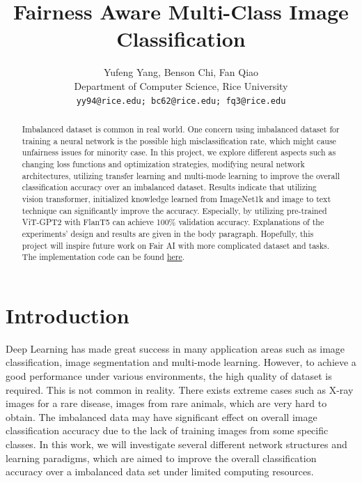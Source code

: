 \documentclass[10pt,twocolumn,letterpaper]{article}
\begin{document}
\title{Fairness Aware Multi-Class Image Classification }
\author{Yufeng Yang, Benson Chi, Fan Qiao\\
Department of Computer Science, Rice University\\
{\tt\small yy94@rice.edu; bc62@rice.edu; fq3@rice.edu}
}

\maketitle

\begin{abstract}
   Imbalanced dataset is common in real world. One concern using imbalanced dataset for training a neural network is the possible high misclassification rate, which might cause unfairness issues for minority case. In this project, we explore different aspects such as changing loss functions and optimization strategies, modifying neural network architectures, utilizing transfer learning and multi-mode learning to improve the overall classification accuracy over an imbalanced dataset. Results indicate that utilizing vision transformer, initialized knowledge learned from ImageNet1k and image to text technique can significantly improve the accuracy. Especially, by utilizing pre-trained ViT-GPT2 with FlanT5 can achieve 100$\%$ validation accuracy. Explanations of the experiments' design and results are given in the body paragraph. Hopefully, this project will inspire future work on Fair AI with more complicated dataset and tasks. The implementation code can be found  \href{https://drive.google.com/file/d/1mABSGeTZZYIpDUBeLx3tYdxOh_GtiS4D/view?usp=sharing}{here}.
\end{abstract}




\section{Introduction}
Deep Learning has made great success in many application areas such as image classification, image segmentation and multi-mode learning. However, to achieve a good performance under various environments, the high quality of dataset is required. This is not common in reality. There exists extreme cases such as X-ray images for a rare disease, images from rare animals, which are very hard to obtain. The imbalanced data may have significant effect on overall image classification accuracy due to the lack of training images from some specific classes. In this work, we will investigate several different network structures and learning paradigms, which are aimed to improve the overall classification accuracy over a imbalanced data set under limited computing resources.\\
\end{document}
